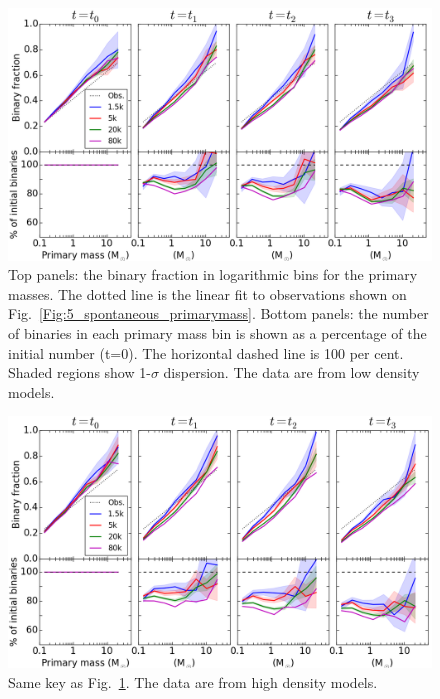 \begin{figure}
\begin{center}
\includegraphics[width=\textwidth]{Figures/6_BinFrac_vs_mass_LD_dispersion}
\caption[Binary fraction vs primary mass - Low density]{ Top panels: the binary fraction in logarithmic bins for the primary masses. The dotted line is the linear fit to observations shown on Fig.~\protect\ref{Fig:5_spontaneous_primarymass}. Bottom panels: the number of binaries in each primary mass bin is shown as a percentage of the initial number (t=0). The horizontal dashed line is 100 per cent. Shaded regions show 1-$\sigma$ dispersion. The data are from low density models.}
\label{Fig:6_BinFracVsMass_LD}
\end{center}
\end{figure}


\begin{figure}
\begin{center}
\includegraphics[width=\textwidth]{Figures/6_BinFrac_vs_mass_HD_dispersion}
\caption[Binary fraction vs primary mass - High density]{ Same key as Fig.~\protect\ref{Fig:6_BinFracVsMass_LD}.  The data are from high density models.}
\label{Fig:6_BinFracVsMass_HD}
\end{center}
\end{figure}


